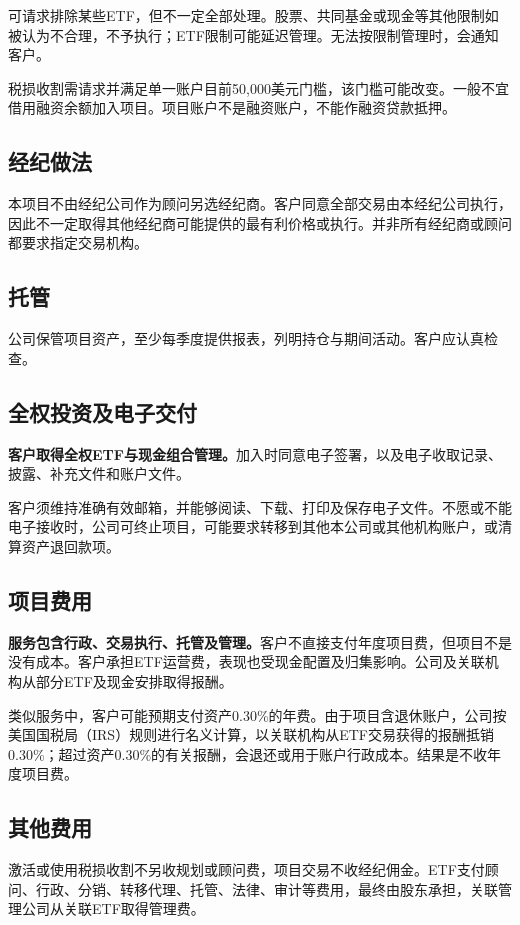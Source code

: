 \documentclass[UTF8,fontset=none,11pt,a4paper]{ctexart}
\begin{document}
可请求排除某些ETF，但不一定全部处理。股票、共同基金或现金等其他限制如被认为不合理，不予执行；ETF限制可能延迟管理。无法按限制管理时，会\allowbreak\mbox{通知客户。}


税损收割需请求并满足单一账户目前50,000美元门槛，该门槛可能改变。一般不宜借用融资余额加入项目。项目账户不是融资账户，不能作融资\allowbreak\mbox{贷款抵押。}


\subsection*{经纪做法}
本项目不由经纪公司作为顾问另选经纪商。客户同意全部交易由本经纪公司执行，因此不一定取得其他经纪商可能提供的最有利价格或执行。并非所有经纪商或顾问都要求指定\allowbreak\mbox{交易机构。}


\subsection*{托管}
公司保管项目资产，至少每季度提供报表，列明持仓与期间活动。客户应\allowbreak\mbox{认真检查。}


\subsection*{全权投资及电子交付}
\textbf{客户取得全权ETF与现金组合管理。}加入时同意电子签署，以及电子收取记录、披露、补充文件和\allowbreak\mbox{账户文件。}


客户须维持准确有效邮箱，并能够阅读、下载、打印及保存电子文件。不愿或不能电子接收时，公司可终止项目，可能要求转移到其他本公司或其他机构账户，或清算资产\allowbreak\mbox{退回款项。}


\subsection*{项目费用}
\textbf{服务包含行政、交易执行、托管及管理。}客户不直接支付年度项目费，但项目不是没有成本。客户承担ETF运营费，表现也受现金配置及归集影响。公司及关联机构从部分ETF及现金安排\allowbreak\mbox{取得报酬。}


类似服务中，客户可能预期支付资产0.30\%的年费。由于项目含退休账户，公司按美国国税局（IRS）规则进行名义计算，以关联机构从ETF交易获得的报酬抵销0.30\%；超过资产0.30\%的有关报酬，会退还或用于账户行政成本。结果是不收年度\allowbreak\mbox{项目费。}


\subsection*{其他费用}
激活或使用税损收割不另收规划或顾问费，项目交易不收经纪佣金。ETF支付顾问、行政、分销、转移代理、托管、法律、审计等费用，最终由股东承担，关联管理公司从关联ETF取\allowbreak\mbox{得管理费。}
\end{document}
